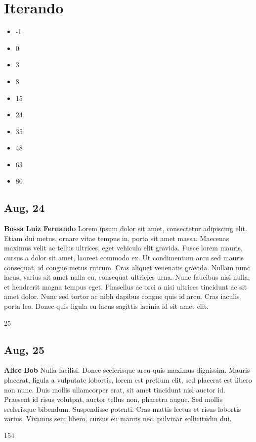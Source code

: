 \documentclass[12pt,a4paper]{article}
\begin{document}
\section{Iterando}
\begin{itemize}
    \item -1
    \item 0
    \item 3
    \item 8
    \item 15
    \item 24
    \item 35
    \item 48
    \item 63
    \item 80
\end{itemize}

\subsection{ Aug, 24 }
 \textbf{Bossa} 
 \textbf{Luiz} 
 \textbf{Fernando} 
 Lorem ipsum dolor sit amet, consectetur adipiscing elit. Etiam dui metus, ornare vitae tempus in, porta sit amet massa. Maecenas maximus velit ac tellus ultrices, eget vehicula elit gravida. Fusce lorem mauris, cursus a dolor sit amet, laoreet commodo ex. Ut condimentum arcu sed mauris consequat, id congue metus rutrum. Cras aliquet venenatis gravida. Nullam nunc lacus, varius sit amet nulla eu, consequat ultricies urna. Nunc faucibus nisi nulla, et hendrerit magna tempus eget. Phasellus ac orci a nisi ultrices tincidunt ac sit amet dolor. Nunc sed tortor ac nibh dapibus congue quis id arcu. Cras iaculis porta leo. Donec quis ligula eu lacus sagittis lacinia id sit amet elit. 


25 

\subsection{ Aug, 25 }
 \textbf{Alice} 
 \textbf{Bob} 
 Nulla facilisi. Donec scelerisque arcu quis maximus dignissim. Mauris placerat, ligula a vulputate lobortis, lorem est pretium elit, sed placerat est libero non nunc. Duis mollis ullamcorper erat, sit amet tincidunt nisl auctor id. Praesent id risus volutpat, auctor tellus non, pharetra augue. Sed mollis scelerisque bibendum. Suspendisse potenti. Cras mattis lectus et risus lobortis varius. Vivamus sem libero, cursus eu mauris nec, pulvinar sollicitudin dui. 


154 
\end{document}
